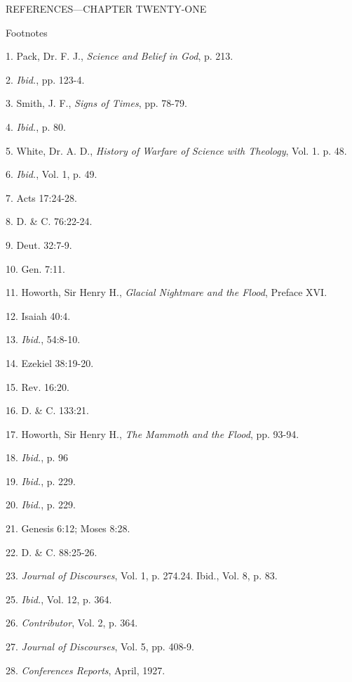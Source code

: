 \newpage
REFERENCES—CHAPTER TWENTY-ONE

Footnotes

1. Pack, Dr. F. J., \textit{Science and Belief in God}, p. 213.

2. \textit{Ibid.}, pp. 123-4.

3. Smith, J. F., \textit{Signs of Times}, pp. 78-79.

4. \textit{Ibid.}, p. 80.

5. White, Dr. A. D., \textit{History of Warfare of Science with Theology}, Vol. 1. p. 48.

6. \textit{Ibid.}, Vol. 1, p. 49.

7. Acts 17:24-28.

8. D. \& C. 76:22-24.

9. Deut. 32:7-9.

10. Gen. 7:11.

11. Howorth, Sir Henry H., \textit{Glacial Nightmare and the Flood}, Preface XVI.

12. Isaiah 40:4.

13. \textit{Ibid.}, 54:8-10.

14. Ezekiel 38:19-20.

15. Rev. 16:20.

16. D. \& C. 133:21.

17. Howorth, Sir Henry H., \textit{The Mammoth and the Flood}, pp. 93-94.

18. \textit{Ibid.}, p. 96

19. \textit{Ibid.}, p. 229.

20. \textit{Ibid.}, p. 229.

21. Genesis 6:12; Moses 8:28.

22. D. \& C. 88:25-26.

23. \textit{Journal of Discourses}, Vol. 1, p. 274.24. Ibid., Vol. 8, p. 83.

25. \textit{Ibid.}, Vol. 12, p. 364.

26. \textit{Contributor}, Vol. 2, p. 364.

27. \textit{Journal of Discourses}, Vol. 5, pp. 408-9.

28. \textit{Conferences Reports}, April, 1927.


